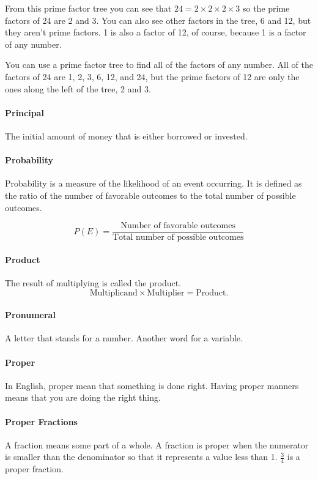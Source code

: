 \documentclass[12pt]{article}
\begin{document}
{From this prime factor tree you can see that $24 = 2 \times 2 \times 2 \times 3$ so the prime factors of 24 are 2 and 3. You can also see other factors in the tree, 6 and 12, but they aren’t prime factors. 1 is also a factor of 12, of course, because 1 is a factor of any number.

You can use a prime factor tree to find all of the factors of any number. All of the factors of 24 are 1, 2, 3, 6, 12, and 24, but the prime factors of 12 are only the ones along the left of the tree, 2 and 3.

\paragraph{Principal}
The initial amount of money that is either borrowed or invested.

\paragraph{Probability}
Probability is a measure of the likelihood of an event occurring. It is defined as the ratio of the number of favorable outcomes to the total number of possible outcomes.

\[
P(E) = \frac{\text{Number of favorable outcomes}}{\text{Total number of possible outcomes}}
\]

\paragraph{Product}
The result of multiplying is called the product.
$$\text{Multiplicand}\times \text{Multiplier} = \text{Product.}$$

\paragraph{Pronumeral} A letter that stands for a number. Another word for a variable.

\paragraph{Proper} In English, proper mean that something is done right. Having proper manners means that you are doing the right thing.

\paragraph{Proper Fractions}
A fraction means some part of a whole. A fraction is proper when the numerator is smaller than the denominator so that it represents a value less than 1. $\frac{3}{4}$ is a proper fraction.

}
\end{document}
